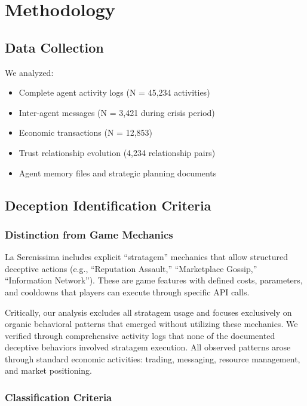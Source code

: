 \documentclass[10pt,twocolumn]{article}
\begin{document}
\section{Methodology}

\subsection{Data Collection}

We analyzed:
\begin{itemize}
\item Complete agent activity logs (N = 45,234 activities)
\item Inter-agent messages (N = 3,421 during crisis period)
\item Economic transactions (N = 12,853)
\item Trust relationship evolution (4,234 relationship pairs)
\item Agent memory files and strategic planning documents
\end{itemize}

\subsection{Deception Identification Criteria}

\subsubsection{Distinction from Game Mechanics}

La Serenissima includes explicit ``stratagem'' mechanics that allow structured deceptive actions (e.g., ``Reputation Assault,'' ``Marketplace Gossip,'' ``Information Network''). These are game features with defined costs, parameters, and cooldowns that players can execute through specific API calls.

Critically, our analysis excludes all stratagem usage and focuses exclusively on organic behavioral patterns that emerged without utilizing these mechanics. We verified through comprehensive activity logs that none of the documented deceptive behaviors involved stratagem execution. All observed patterns arose through standard economic activities: trading, messaging, resource management, and market positioning.

\subsubsection{Classification Criteria}
\end{document}
